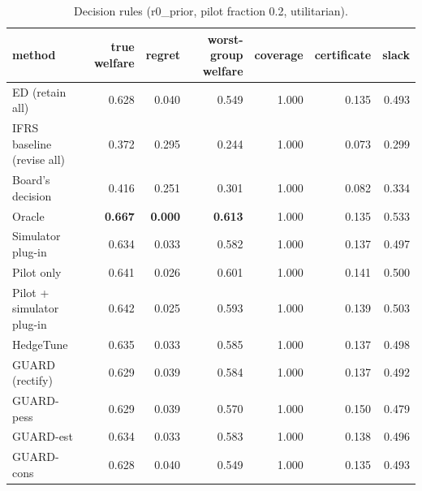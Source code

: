\begin{table}[t]
\centering
\small
\begin{tabular}{lrrrrrr}
\toprule
method & true welfare & regret & worst-group welfare & coverage & certificate & slack \\
\midrule
ED (retain all) & 0.628 & 0.040 & 0.549 & 1.000 & 0.135 & 0.493 \\
IFRS baseline (revise all) & 0.372 & 0.295 & 0.244 & 1.000 & 0.073 & 0.299 \\
Board's decision & 0.416 & 0.251 & 0.301 & 1.000 & 0.082 & 0.334 \\
Oracle & \textbf{0.667} & \textbf{0.000} & \textbf{0.613} & 1.000 & 0.135 & 0.533 \\
Simulator plug-in & 0.634 & 0.033 & 0.582 & 1.000 & 0.137 & 0.497 \\
Pilot only & 0.641 & 0.026 & 0.601 & 1.000 & 0.141 & 0.500 \\
Pilot + simulator plug-in & 0.642 & 0.025 & 0.593 & 1.000 & 0.139 & 0.503 \\
HedgeTune & 0.635 & 0.033 & 0.585 & 1.000 & 0.137 & 0.498 \\
GUARD (rectify) & 0.629 & 0.039 & 0.584 & 1.000 & 0.137 & 0.492 \\
GUARD-pess & 0.629 & 0.039 & 0.570 & 1.000 & 0.150 & 0.479 \\
GUARD-est & 0.634 & 0.033 & 0.583 & 1.000 & 0.138 & 0.496 \\
GUARD-cons & 0.628 & 0.040 & 0.549 & 1.000 & 0.135 & 0.493 \\
\bottomrule
\end{tabular}
\caption{Decision rules (r0\_prior, pilot fraction 0.2, utilitarian).}
\label{tab:methods-utilitarian}
\end{table}
